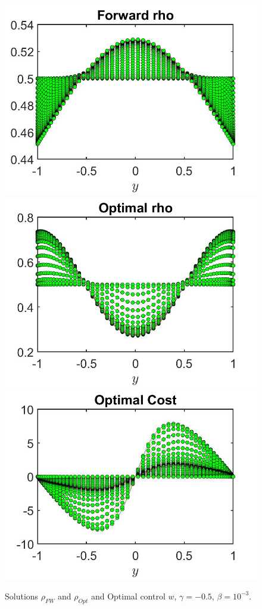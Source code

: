 \documentclass[11pt, a4paper]{article}
\theoremstyle{definition}
\begin{document}
\begin{figure}[h]
	\includegraphics[scale=0.3]{rhoFW0305.jpg}
	\includegraphics[scale=0.3]{wOpt0305.jpg}
	\includegraphics[scale=0.3]{rhoOpt0305.jpg}
	\caption{Solutions $\rho_{FW}$ and $\rho_{Opt}$ and Optimal control $w$, $\gamma = - 0.5$, $\beta = 10^{-3}$.}
	\label{rho00305}
\end{figure}
\end{document}
